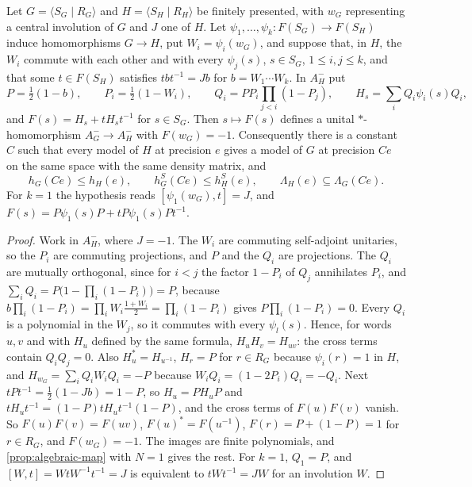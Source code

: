 \begin{proposition}\label{prop:corner}
Let $G=\langle S_G\mid R_G\rangle$ and $H=\langle S_H\mid R_H\rangle$ be finitely presented, with $w_G$ representing a central
involution of $G$ and $J$ one of $H$. Let $\psi_1,\dots,\psi_k:F(S_G)\to F(S_H)$ induce homomorphisms $G\to H$, put
$W_i=\psi_i(w_G)$, and suppose that, in $H$, the $W_i$ commute with each other and with every $\psi_j(s)$, $s\in S_G$,
$1\le i,j\le k$, and that some $t\in F(S_H)$ satisfies $tbt^{-1}=Jb$ for $b=W_1\cdots W_k$. In $A_H^-$ put
\[
P=\tfrac12(1-b),\qquad P_i=\tfrac12(1-W_i),\qquad Q_i=PP_i\prod_{j<i}(1-P_j),\qquad H_s=\sum_iQ_i\psi_i(s)Q_i ,
\]
and $F(s)=H_s+tH_st^{-1}$ for $s\in S_G$. Then $s\mapsto F(s)$ defines a unital $*$-homomorphism $A_G^-\to A_H^-$ with
$F(w_G)=-1$. Consequently there is a constant $C$ such that every model of $H$ at precision $e$ gives a model of $G$ at
precision $Ce$ on the same space with the same density matrix, and
\[
h_G(Ce)\le h_H(e),\qquad h^S_G(Ce)\le h^S_H(e),\qquad\Lambda_H(e)\subseteq\Lambda_G(Ce).
\]
For $k=1$ the hypothesis reads $[\psi_1(w_G),t]=J$, and $F(s)=P\psi_1(s)P+tP\psi_1(s)Pt^{-1}$.
\end{proposition}

\begin{proof}
Work in $A_H^-$, where $J=-1$. The $W_i$ are commuting self-adjoint unitaries, so the $P_i$ are commuting projections,
and $P$ and the $Q_i$ are projections. The $Q_i$ are mutually orthogonal, since for $i<j$ the factor $1-P_i$ of $Q_j$
annihilates $P_i$, and $\sum_iQ_i=P\bigl(1-\prod_i(1-P_i)\bigr)=P$, because $b\prod_i(1-P_i)=\prod_iW_i\frac{1+W_i}2=\prod_i(1-P_i)$
gives $P\prod_i(1-P_i)=0$. Every $Q_i$ is a polynomial in the $W_j$, so it commutes with every $\psi_l(s)$. Hence, for
words $u,v$ and with $H_u$ defined by the same formula, $H_uH_v=H_{uv}$: the cross terms contain $Q_iQ_j=0$. Also
$H_u^*=H_{u^{-1}}$, $H_r=P$ for $r\in R_G$ because $\psi_i(r)=1$ in $H$, and $H_{w_G}=\sum_iQ_iW_iQ_i=-P$ because
$W_iQ_i=(1-2P_i)Q_i=-Q_i$. Next $tPt^{-1}=\frac12(1-Jb)=1-P$, so $H_u=PH_uP$ and $tH_ut^{-1}=(1-P)tH_ut^{-1}(1-P)$, and the
cross terms of $F(u)F(v)$ vanish. So $F(u)F(v)=F(uv)$, $F(u)^*=F(u^{-1})$, $F(r)=P+(1-P)=1$ for $r\in R_G$, and
$F(w_G)=-1$. The images are finite polynomials, and \cref{prop:algebraic-map} with $N=1$ gives the rest. For $k=1$,
$Q_1=P$, and $[W,t]=WtW^{-1}t^{-1}=J$ is equivalent to $tWt^{-1}=JW$ for an involution $W$.
\end{proof}

